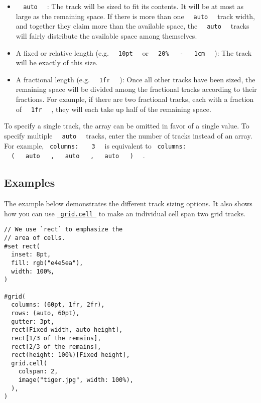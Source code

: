 \begin{itemize}
\item
  \texttt{\ }{\texttt{\ auto\ }}\texttt{\ } : The track will be sized to
  fit its contents. It will be at most as large as the remaining space.
  If there is more than one \texttt{\ }{\texttt{\ auto\ }}\texttt{\ }
  track width, and together they claim more than the available space,
  the \texttt{\ }{\texttt{\ auto\ }}\texttt{\ } tracks will fairly
  distribute the available space among themselves.
\item
  A fixed or relative length (e.g.
  \texttt{\ }{\texttt{\ 10pt\ }}\texttt{\ } or
  \texttt{\ }{\texttt{\ 20\%\ }}\texttt{\ }{\texttt{\ -\ }}\texttt{\ }{\texttt{\ 1cm\ }}\texttt{\ }
  ): The track will be exactly of this size.
\item
  A fractional length (e.g. \texttt{\ }{\texttt{\ 1fr\ }}\texttt{\ } ):
  Once all other tracks have been sized, the remaining space will be
  divided among the fractional tracks according to their fractions. For
  example, if there are two fractional tracks, each with a fraction of
  \texttt{\ }{\texttt{\ 1fr\ }}\texttt{\ } , they will each take up half
  of the remaining space.
\end{itemize}

To specify a single track, the array can be omitted in favor of a single
value. To specify multiple \texttt{\ }{\texttt{\ auto\ }}\texttt{\ }
tracks, enter the number of tracks instead of an array. For example,
\texttt{\ columns:\ } \texttt{\ }{\texttt{\ 3\ }}\texttt{\ } is
equivalent to \texttt{\ columns:\ }
\texttt{\ }{\texttt{\ (\ }}\texttt{\ }{\texttt{\ auto\ }}\texttt{\ }{\texttt{\ ,\ }}\texttt{\ }{\texttt{\ auto\ }}\texttt{\ }{\texttt{\ ,\ }}\texttt{\ }{\texttt{\ auto\ }}\texttt{\ }{\texttt{\ )\ }}\texttt{\ }
.

\subsection{Examples}\label{examples}

The example below demonstrates the different track sizing options. It
also shows how you can use
\href{/docs/reference/layout/grid/\#definitions-cell}{\texttt{\ grid.cell\ }}
to make an individual cell span two grid tracks.

\begin{verbatim}
// We use `rect` to emphasize the
// area of cells.
#set rect(
  inset: 8pt,
  fill: rgb("e4e5ea"),
  width: 100%,
)

#grid(
  columns: (60pt, 1fr, 2fr),
  rows: (auto, 60pt),
  gutter: 3pt,
  rect[Fixed width, auto height],
  rect[1/3 of the remains],
  rect[2/3 of the remains],
  rect(height: 100%)[Fixed height],
  grid.cell(
    colspan: 2,
    image("tiger.jpg", width: 100%),
  ),
)
\end{verbatim}

